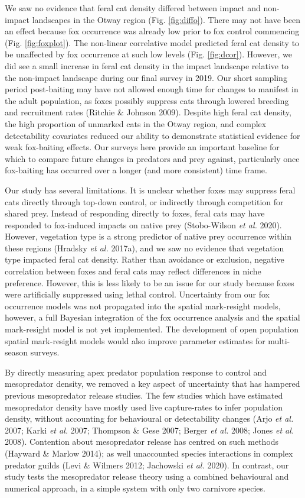 \documentclass[]{elsarticle} %
\begin{document}
We saw no evidence that feral cat density differed between impact and non-impact landscapes in the Otway region (Fig. \ref{fig:diffo}). There may not have been an effect because fox occurrence was already low prior to fox control commencing (Fig. \ref{fig:foxplot}). The non-linear correlative model predicted feral cat density to be unaffected by fox occurrence at such low levels (Fig. \ref{fig:dcor}). However, we did see a small increase in feral cat density in the impact landscape relative to the non-impact landscape during our final survey in 2019. Our short sampling period post-baiting may have not allowed enough time for changes to manifest in the adult population, as foxes possibly suppress cats through lowered breeding and recruitment rates (Ritchie \& Johnson 2009). Despite high feral cat density, the high proportion of unmarked cats in the Otway region, and complex detectability covariates reduced our ability to demonstrate statistical evidence for weak fox-baiting effects. Our surveys here provide an important baseline for which to compare future changes in predators and prey against, particularly once fox-baiting has occurred over a longer (and more consistent) time frame.

Our study has several limitations. It is unclear whether foxes may suppress feral cats directly through top-down control, or indirectly through competition for shared prey. Instead of responding directly to foxes, feral cats may have responded to fox-induced impacts on native prey (Stobo-Wilson \emph{et al.} 2020). However, vegetation type is a strong predictor of native prey occurrence within these regions (Hradsky \emph{et al.} 2017a), and we saw no evidence that vegetation type impacted feral cat density. Rather than avoidance or exclusion, negative correlation between foxes and feral cats may reflect differences in niche preference. However, this is less likely to be an issue for our study because foxes were artificially suppressed using lethal control. Uncertainty from our fox occurrence models was not propagated into the spatial mark-resight models, however, a full Bayesian integration of the fox occurrence analysis and the spatial mark-resight model is not yet implemented. The development of open population spatial mark-resight models would also improve parameter estimates for multi-season surveys.

By directly measuring apex predator population response to control and mesopredator density, we removed a key aspect of uncertainty that has hampered previous mesopredator release studies. The few studies which have estimated mesopredator density have mostly used live capture-rates to infer population density, without accounting for behavioural or detectability changes (Arjo \emph{et al.} 2007; Karki \emph{et al.} 2007; Thompson \& Gese 2007; Berger \emph{et al.} 2008; Jones \emph{et al.} 2008). Contention about mesopredator release has centred on such methods (Hayward \& Marlow 2014); as well unaccounted species interactions in complex predator guilds (Levi \& Wilmers 2012; Jachowski \emph{et al.} 2020). In contrast, our study tests the mesopredator release theory using a combined behavioural and numerical approach, in a simple system with only two carnivore species.
\end{document}
